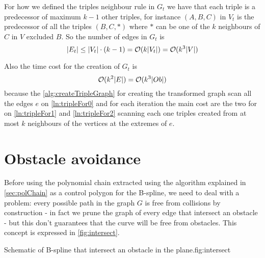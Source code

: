 \documentclass[dissertation.tex]{subfiles}
\begin{document}
For how we defined the triples neighbour rule in $G_t$ we have
that each triple is a predecessor of maximum $k-1$ other triples, for
instance $(A,B,C)$ in $V_t$ is the predecessor of all the triples
$(B,C,*)$ where $*$ can be one of the $k$ neighbours
of $C$ in $V$ excluded $B$. So the number of edges in $G_t$ is
\begin{equation}
  \label{eq:numEdgesTriples}
  |E_t|\leq |V_t|\cdot (k-1)=\mathcal{O}(k|V_t|)=\mathcal{O}(k^3|V|)
\end{equation}

Also the time cost for the creation of $G_t$ is
\begin{equation}
  \label{eq:costVt}
  \mathcal{O}(k^2|E|)=\mathcal{O}(k^3|Ob|)
\end{equation}
because the \cref{alg:createTripleGraph} for creating the transformed
graph scan all the edges $e$ on \cref{ln:tripleFor0} and for each
iteration
the main cost are the two for on \cref{ln:tripleFor1} and
\cref{ln:tripleFor2} scanning each one triples created from at most
$k$ neighbours
of the vertices at the extremes of $e$.

\section{Obstacle avoidance}\label{sec:obsAvoid}
Before using the polynomial chain extracted using the algorithm
explained in \cref{sec:polChain} as a control polygon for the
B-spline, we need to deal with a
problem: every possible path in the graph $G$ is
free from collisions by construction - in fact we prune the graph of
every edge that intersect an obstacle - but this don't guarantees that
the curve will be free from obstacles. This concept is expressed in \cref{fig:intersect}.
\begin{myfig}{Schematic of B-spline that intersect an obstacle in the plane.}{fig:intersect}
\end{myfig}
\end{document}
